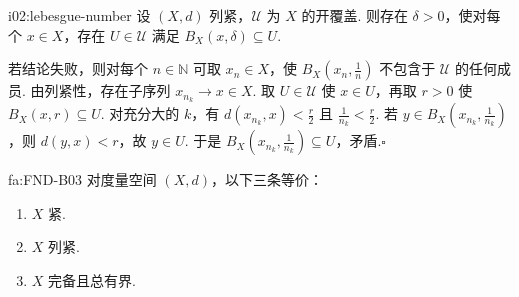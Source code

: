 \begin{FALemma}{i02:lebesgue-number}
设 \(\displaystyle (X,d)\) 列紧，\(\displaystyle \mathcal U\) 为 \(\displaystyle X\) 的开覆盖. 则存在 \(\displaystyle \delta>0\)，使对每个 \(\displaystyle x\in X\)，存在 \(\displaystyle U\in\mathcal U\) 满足 \(\displaystyle B_X(x,\delta)\subseteq U\).
\end{FALemma}

\begin{FAProof}
若结论失败，则对每个 \(\displaystyle n\in\mathbb N\) 可取 \(\displaystyle x_n\in X\)，使 \(\displaystyle B_X(x_n,\frac{1}{n})\) 不包含于 \(\displaystyle \mathcal U\) 的任何成员. 由列紧性，存在子序列 \(\displaystyle x_{n_k}\to x\in X\). 取 \(\displaystyle U\in\mathcal U\) 使 \(\displaystyle x\in U\)，再取 \(\displaystyle r>0\) 使 \(\displaystyle B_X(x,r)\subseteq U\). 对充分大的 \(\displaystyle k\)，有 \(\displaystyle d(x_{n_k},x)<\frac{r}{2}\) 且 \(\displaystyle \frac{1}{n_k}<\frac{r}{2}\). 若 \(\displaystyle y\in B_X(x_{n_k},\frac{1}{n_k})\)，则 \(\displaystyle d(y,x)<r\)，故 \(\displaystyle y\in U\). 于是 \(\displaystyle B_X(x_{n_k},\frac{1}{n_k})\subseteq U\)，矛盾.\hfill\(\square\)
\end{FAProof}

\begin{FATheorem}[B][紧、列紧、完备且总有界的等价]{fa:FND-B03}
对度量空间 \(\displaystyle (X,d)\)，以下三条等价：
\begin{enumerate}[label=\textup{(\roman*)}]
\item \(\displaystyle X\) 紧.
\item \(\displaystyle X\) 列紧.
\item \(\displaystyle X\) 完备且总有界.
\end{enumerate}
\end{FATheorem}

